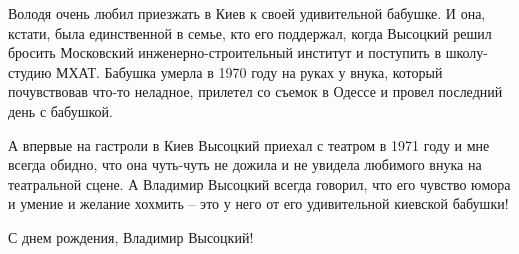 Володя очень любил приезжать в Киев к своей удивительной бабушке. И она,
кстати, была единственной в семье, кто его поддержал, когда Высоцкий решил
бросить Московский инженерно-строительный институт и поступить в школу-студию
МХАТ. Бабушка умерла в 1970 году на руках у внука, который почувствовав что-то
неладное, прилетел со съемок в Одессе и провел последний день с бабушкой.

А впервые на гастроли в Киев Высоцкий приехал с театром в 1971 году и мне
всегда обидно, что она чуть-чуть не дожила и не увидела любимого внука на
театральной сцене. А Владимир Высоцкий всегда говорил, что его чувство юмора и
умение и желание хохмить – это у него от его удивительной киевской бабушки!

С днем рождения, Владимир Высоцкий!

